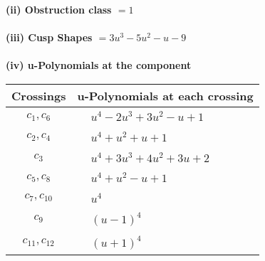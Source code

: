 \documentclass[1p]{elsarticle_modified}
\theoremstyle{definition}
\begin{document}
\flushleft \textbf{(ii) Obstruction class $= 1$}\\~\\
\flushleft \textbf{(iii) Cusp Shapes $= 3 u^3-5 u^2- u-9$}\\~\\
\newpage\renewcommand{\arraystretch}{1}
\flushleft \textbf{(iv) u-Polynomials at the component}\newline \\
\begin{tabular}{m{50pt}|m{274pt}}
Crossings & \hspace{64pt}u-Polynomials at each crossing \\
\hline $$\begin{aligned}c_{1},c_{6}\end{aligned}$$&$\begin{aligned}
&u^4-2 u^3+3 u^2- u+1
\end{aligned}$\\
\hline $$\begin{aligned}c_{2},c_{4}\end{aligned}$$&$\begin{aligned}
&u^4+u^2+u+1
\end{aligned}$\\
\hline $$\begin{aligned}c_{3}\end{aligned}$$&$\begin{aligned}
&u^4+3 u^3+4 u^2+3 u+2
\end{aligned}$\\
\hline $$\begin{aligned}c_{5},c_{8}\end{aligned}$$&$\begin{aligned}
&u^4+u^2- u+1
\end{aligned}$\\
\hline $$\begin{aligned}c_{7},c_{10}\end{aligned}$$&$\begin{aligned}
&u^4
\end{aligned}$\\
\hline $$\begin{aligned}c_{9}\end{aligned}$$&$\begin{aligned}
&(u-1)^4
\end{aligned}$\\
\hline $$\begin{aligned}c_{11},c_{12}\end{aligned}$$&$\begin{aligned}
&(u+1)^4
\end{aligned}$\\
\hline
\end{tabular}\\~\\
\end{document}
